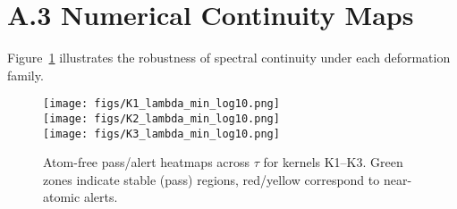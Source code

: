 
\section*{A.3 Numerical Continuity Maps}
Figure~\ref{fig:heatmaps} illustrates the robustness of spectral continuity under each deformation family.
\begin{figure}[h!]
    \centering
    \texttt{[image: figs/K1\_lambda\_min\_log10.png]}\\
    \texttt{[image: figs/K2\_lambda\_min\_log10.png]}\\
    \texttt{[image: figs/K3\_lambda\_min\_log10.png]}
    \caption{Atom-free pass/alert heatmaps across $\tau$ for kernels K1--K3. Green zones indicate stable (pass) regions, red/yellow correspond to near-atomic alerts.}
    \label{fig:heatmaps}
\end{figure}
